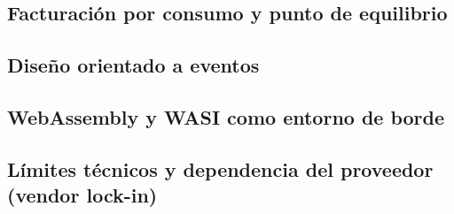 \subsection{Facturación por consumo y punto de equilibrio}


\subsection{Diseño orientado a eventos}


\subsection{WebAssembly y WASI como entorno de borde}


\subsection{Límites técnicos y dependencia del proveedor (vendor lock-in)}


\clearpage
